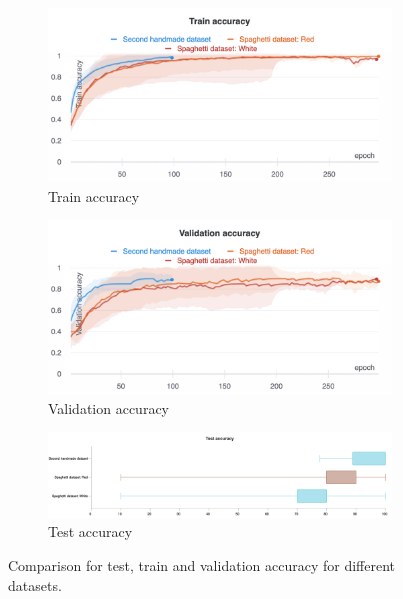 	\begin{figure}[hbtp]
		\begin{subfigure}{0.49\textwidth}
		\centering
		\includegraphics[width=\linewidth]{fig/results/wandb/spaghetti_vs_secondhandmade/charts/Section-2-Panel-0-d9vatkbok}
		\caption{Train accuracy}
		\label{fig:res:comp:tra}
		\end{subfigure}
		\hspace*{\fill}
		\begin{subfigure}{0.49\textwidth}
		\centering
		\includegraphics[width=\linewidth]{fig/results/wandb/spaghetti_vs_secondhandmade/charts/Section-2-Panel-1-h8kizzbrm}
		\caption{Validation accuracy}
		\label{fig:res:comp:va}
		\end{subfigure}
		\hspace*{\fill}
		\begin{subfigure}{0.6\textwidth}
		\centering
		\includegraphics[width=\linewidth]{fig/results/wandb/spaghetti_vs_secondhandmade/charts/Section-2-Panel-2-mwwjkupji}
		\caption{Test accuracy}
		\label{fig:res:comp:ta}
		\end{subfigure}
		\hspace*{\fill}
		\caption{Comparison for test, train and validation accuracy for different datasets.}
		\label{fig:res:comp}
	\end{figure}
	

